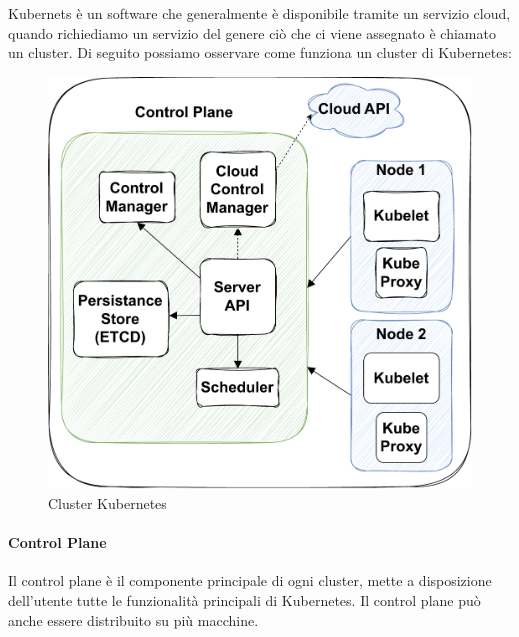 Kubernets è un software che generalmente è disponibile tramite un servizio cloud, quando richiediamo un servizio del genere ciò che ci viene assegnato è chiamato un cluster. Di seguito possiamo osservare come funziona un cluster di Kubernetes:

\begin{figure}[h]
    \centering
    \includegraphics[scale=0.65]{capitoli/immagini/10_cluster_kubernetes.pdf}
    \caption{Cluster Kubernetes}
    \label{fig:Kubernetes_Cluster}
\end{figure}

\paragraph{Control Plane}
Il control plane è il componente principale di ogni cluster, mette a disposizione dell'utente tutte le funzionalità principali di Kubernetes. Il control plane può anche essere distribuito su più macchine.

